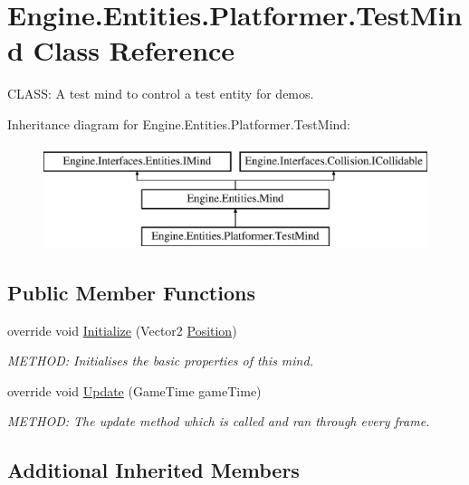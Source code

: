 \hypertarget{a00334}{}\section{Engine.\+Entities.\+Platformer.\+Test\+Mind Class Reference}
\label{a00334}


C\+L\+A\+SS\+: A test mind to control a test entity for demos.  


Inheritance diagram for Engine.\+Entities.\+Platformer.\+Test\+Mind\+:\begin{figure}[H]
\begin{center}
\leavevmode
\includegraphics[height=3.000000cm]{da/d75/a00334}
\end{center}
\end{figure}
\subsection*{Public Member Functions}
\begin{DoxyCompactItemize}
\item 
override void \hyperlink{a00334_ae94a647a0b9c6f1d99abb61e36612ba7}{Initialize} (Vector2 \hyperlink{a00318_ad94b3975c0873fee06b5bd5a75bd38cd}{Position})
\begin{DoxyCompactList}\small\item\em M\+E\+T\+H\+OD\+: Initialises the basic properties of this mind. \end{DoxyCompactList}\item 
override void \hyperlink{a00334_a1817f5df935d637c737d510e39fd251f}{Update} (Game\+Time game\+Time)
\begin{DoxyCompactList}\small\item\em M\+E\+T\+H\+OD\+: The update method which is called and ran through every frame. \end{DoxyCompactList}\end{DoxyCompactItemize}
\subsection*{Additional Inherited Members}


